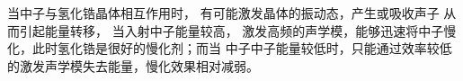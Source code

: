 当中子与氢化锆晶体相互作用时，%
有可能激发晶体的振动态，产生或吸收声子%
从而引起能量转移，%
当入射中子能量较高，%
激发高频的声学模，能够迅速将中子慢化，此时氢化锆是很好的慢化剂；而当%
中子中子能量较低时，只能通过效率较低的激发声学模失去能量，慢化效果相对减弱。


